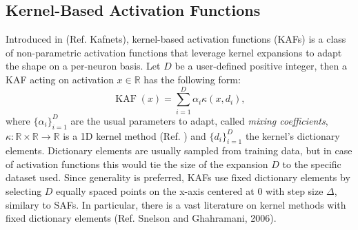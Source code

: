 \documentclass[LaM,binding=0.6cm]{./packages/sapthesis/sapthesis}
\begin{document}
    \subsection{Kernel-Based Activation Functions}
    Introduced in (Ref. Kafnets), kernel-based activation functions (KAFs) is a class of non-parametric activation functions that leverage kernel expansions to adapt the shape on a per-neuron basis.
    Let $D$ be a user-defined positive integer, then a KAF acting on activation $x \in \mathbb{R} $ has the following form:
    \begin{equation}
        \operatorname{KAF} (x) = \sum_{i=1}^{D} \alpha_{i} \kappa\left(x, d_{i}\right),
    \end{equation}
    where $\{ \alpha_i\}_{i=1}^D $ are the usual parameters to adapt, called \textit{mixing coefficients}, $\kappa \colon \mathbb{R} \times \mathbb{R} \to \mathbb{R}$ is a 1D kernel method (Ref. )   
    and $\{ d_i\}_{i=1}^D $ the kernel's dictionary elements. Dictionary elements are usually sampled from training data, but in case of activation functions 
    this would tie the size of the expansion $D$ to the specific dataset used. Since generality is preferred, KAFs use fixed dictionary elements by selecting
    $D$ equally spaced points on the x-axis centered at 0 with step size $\Delta$, similary to SAFs. In particular, there is a vast literature on kernel methods with fixed dictionary elements (Ref. Snelson and Ghahramani, 2006).
\end{document}
